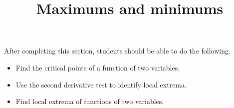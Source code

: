 \documentclass{ximera}
\title{Maximums and minimums}
\begin{document}
\begin{abstract}
\end{abstract}

\maketitle

\begin{sectionOutcomes}

After completing this section, students should be able to do the following.

\begin{itemize}
\item Find the critical points of a function of two variables.
\item Use the second derivative test to identify local extrema.
\item Find local extrema of functions of two variables.
\end{itemize}

\end{sectionOutcomes}
\end{document}
